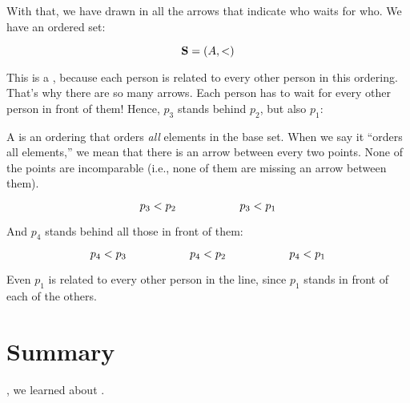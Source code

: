 \documentclass[../../../main.tex]{subfiles}
\begin{document}
With that, we have drawn in all the arrows that indicate who waits for who. We have an ordered set:

\begin{equation*}
  \struct{S} = (\set{A}, \strictorder/)
\end{equation*}

This is a , because each person is related to every other person in this ordering. That's why there are so many arrows. Each person has to wait for every other person in front of them! Hence, $p_{3}$ stands behind $p_{2}$, but also $p_{1}$:

\begin{terminology}
  A  is an ordering that orders \emph{all} elements in the base set. When we say it ``orders all elements,'' we mean that there is an arrow between every two points. None of the points are incomparable (i.e., none of them are missing an arrow between them).
\end{terminology}

\begin{equation*}
  p_{3} \strictorder/ p_{2} \hskip 2cm p_{3} \strictorder/ p_{1}
\end{equation*}

And $p_{4}$ stands behind all those in front of them:

\begin{equation*}
  p_{4} \strictorder/ p_{3} \hskip 2cm p_{4} \strictorder/ p_{2} \hskip 2cm p_{4} \strictorder/ p_{1}
\end{equation*}

Even $p_{1}$ is related to every other person in the line, since $p_{1}$ stands in front of each of the others.


\section{Summary}

, we learned about .
\end{document}
